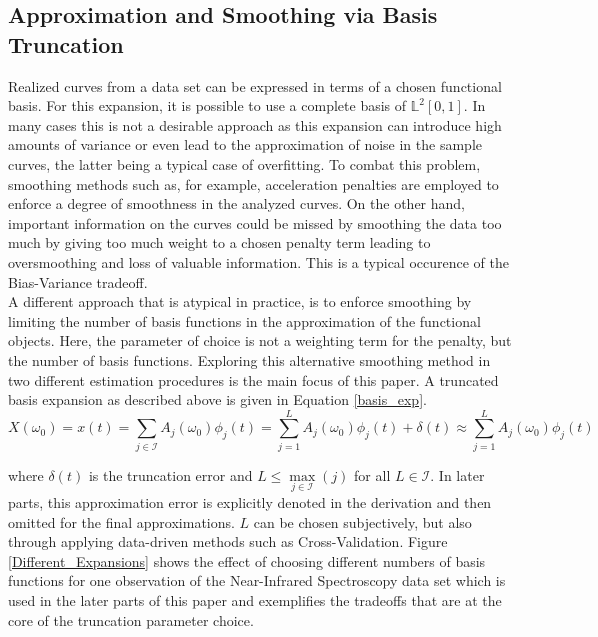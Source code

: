 \documentclass[11pt,twoside,a4paper]{article}
\begin{document}
	\subsection{Approximation and Smoothing via Basis Truncation}
	Realized curves from a data set can be expressed in terms of a chosen functional basis. For this expansion, it is  possible to use a complete basis of $\mathbb{L}^2[0,1]$. In many cases this is not a desirable approach as this expansion can introduce high amounts of variance or even lead to the approximation of noise in the sample curves, the latter being a typical case of overfitting. To combat this problem, smoothing methods such as, for example, acceleration penalties are employed to enforce a degree of smoothness in the analyzed curves. On the other hand, important information on the curves could be missed by smoothing the data too much by giving too much weight to a chosen penalty term leading to oversmoothing and loss of valuable information. This is a typical occurence of the Bias-Variance tradeoff.\\
	
	A different approach that is atypical in practice, is to enforce smoothing by limiting the number of basis functions in the approximation of the functional objects. Here, the parameter of choice is not a weighting term for the penalty, but the number of basis functions. Exploring this alternative smoothing method in two different estimation procedures is the main focus of this paper. A truncated basis expansion as described above is given in Equation \ref{basis_exp}.
	\begin{equation}\label{basis_exp}
		X(\omega_0) = x(t) = \sum_{j \in \mathcal{I}} A_j(\omega_0) \phi_j(t) = \sum_{j = 1}^{L} A_j(\omega_0) \phi_j(t) + \delta(t) \approx \sum_{j = 1}^{L} A_j(\omega_0) \phi_j(t)
	\end{equation}

	where $\delta(t)$ is the truncation error and $L \leq \max\limits_{j \in \mathcal{I}}(j)$ for all $L \in \mathcal{I}$.  In later parts, this approximation error is explicitly denoted in the derivation and then omitted for the final approximations. $L$ can be chosen subjectively, but also through applying data-driven methods such as Cross-Validation. Figure \ref{Different_Expansions} shows the effect of choosing different numbers of basis functions for one observation of the Near-Infrared Spectroscopy data set which is used in the later parts of this paper and exemplifies the tradeoffs that are at the core of the truncation parameter choice.
			
\end{document}
